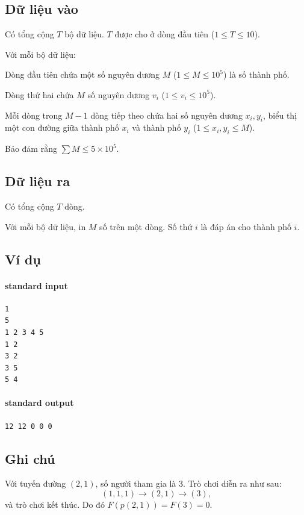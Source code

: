 \documentclass[11pt]{article}
\begin{document}
\subsection*{Dữ liệu vào}

Có tổng cộng \(T\) bộ dữ liệu. \(T\) được cho ở dòng đầu tiên
(\(1\le T\le 10\)).

Với mỗi bộ dữ liệu:

Dòng đầu tiên chứa một số nguyên dương \(M\) (\(1\le M\le 10^5\)) là số thành
phố.

Dòng thứ hai chứa \(M\) số nguyên dương \(v_i\) (\(1\le v_i\le 10^5\)).

Mỗi dòng trong \(M-1\) dòng tiếp theo chứa hai số nguyên dương \(x_i,y_i\),
biểu thị một con đường giữa thành phố \(x_i\) và thành phố \(y_i\)
(\(1\le x_i,y_i\le M\)).

Bảo đảm rằng \(\sum M\le 5\times 10^5\).

\subsection*{Dữ liệu ra}

Có tổng cộng \(T\) dòng.

Với mỗi bộ dữ liệu, in \(M\) số trên một dòng. Số thứ \(i\) là đáp án cho
thành phố \(i\).

\subsection*{Ví dụ}

\paragraph{standard input}
\begin{verbatim}
1
5
1 2 3 4 5
1 2
3 2
3 5
5 4
\end{verbatim}

\paragraph{standard output}
\begin{verbatim}
12 12 0 0 0
\end{verbatim}

\subsection*{Ghi chú}

Với tuyến đường \((2,1)\), số người tham gia là \(3\). Trò chơi diễn ra như
sau:
\[
  (1,1,1)\to(2,1)\to(3),
\]
và trò chơi kết thúc. Do đó \(F(p(2,1))=F(3)=0\).
\end{document}
